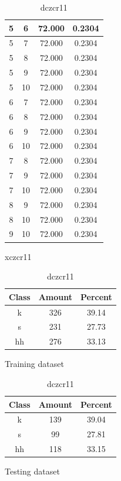 \begin{table}
\begin{subtable}[tbp]{0.4\textwidth}
\begin{tabular}{|c|c|c|c|}
 5 & 6 & 72.000 & 0.2304\\ \hline 
 5 & 7 & 72.000 & 0.2304\\ \hline 
 5 & 8 & 72.000 & 0.2304\\ \hline 
 5 & 9 & 72.000 & 0.2304\\ \hline 
 5 & 10 & 72.000 & 0.2304\\ \hline 
 6 & 7 & 72.000 & 0.2304\\ \hline 
 6 & 8 & 72.000 & 0.2304\\ \hline 
 6 & 9 & 72.000 & 0.2304\\ \hline 
 6 & 10 & 72.000 & 0.2304\\ \hline 
 7 & 8 & 72.000 & 0.2304\\ \hline 
 7 & 9 & 72.000 & 0.2304\\ \hline 
 7 & 10 & 72.000 & 0.2304\\ \hline 
 8 & 9 & 72.000 & 0.2304\\ \hline 
 8 & 10 & 72.000 & 0.2304\\ \hline 
 9 & 10 & 72.000 & 0.2304\\ \hline 

\end{tabular}
 \label{xlzcr11}
\caption{xczcr11}
\end{subtable}


\begin{subtable}[h]{0.45\textwidth}
\centering
\begin{tabular}{|c|c|c|}
\hline
Class & Amount & Percent\\ \hline
k & 326 & 39.14\\ \hline
s & 231 & 27.73\\ \hline
hh & 276 & 33.13\\ \hline
\end{tabular}
\caption{Training dataset}
\end{subtable}
\hfill
\begin{subtable}[h]{0.45\textwidth}
\centering
\begin{tabular}{|c|c|c|}
\hline
Class & Amount & Percent\\ \hline
k & 139 & 39.04\\ \hline
s & 99 & 27.81\\ \hline
hh & 118 & 33.15\\ \hline
\end{tabular}
\caption{Testing dataset}
\end{subtable}
\hfill

\label{dlzcr11}

\caption{dczcr11}

\end{table}\clearpage